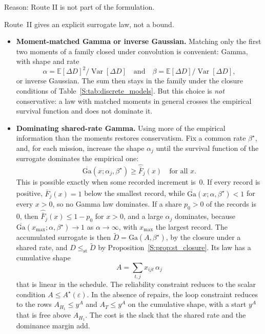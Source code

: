 \documentclass[11pt,a4paper]{article}
\theoremstyle{plain}
\theoremstyle{definition}
\theoremstyle{remark}
\begin{document}
Reason: Route II is not part of the formulation.

Route~II gives an explicit surrogate law, not a bound.
\begin{itemize}
  \item \textbf{Moment-matched Gamma or inverse Gaussian.} Matching only the first two moments of a family closed under convolution is convenient: Gamma, with shape and rate
    \begin{equation}
      \alpha = \mathbb{E}[\Delta D]^2/\operatorname{Var}[\Delta D]
      \quad\text{and}\quad
      \beta = \mathbb{E}[\Delta D]/\operatorname{Var}[\Delta D],
    \end{equation}
    or inverse Gaussian.
    The sum then stays in the family under the closure conditions of Table~\ref{S:tab:discrete_models}.
    But this choice is \emph{not} conservative: a law with matched moments in general crosses the empirical survival function and does not dominate it.
  \item \textbf{Dominating shared-rate Gamma.} Using more of the empirical information than the moments restores conservatism.
    Fix a common rate $\beta^\star$, and, for each mission, increase the shape $\alpha_j$ until the survival function of the surrogate dominates the empirical one:
    \begin{equation}
      \overline{\mathrm{Ga}}(x;\alpha_j,\beta^\star) \ge \widehat{\bar F}_j(x) \quad \text{for all } x.
    \end{equation}
    This is possible exactly when some recorded increment is~$0$.
    If every record is positive, $\widehat{\bar F}_j(x) = 1$ below the smallest record, while $\overline{\mathrm{Ga}}(x;\alpha,\beta^\star) < 1$ for every $x > 0$, so no Gamma law dominates.
    If a share $p_0 > 0$ of the records is~$0$, then $\widehat{\bar F}_j(x) \le 1 - p_0$ for $x > 0$, and a large $\alpha_j$ dominates, because $\overline{\mathrm{Ga}}(x_{\max};\alpha,\beta^\star) \to 1$ as $\alpha \to \infty$, with $x_{\max}$ the largest record.
    The accumulated surrogate is then $\widetilde{D} = \mathrm{Ga}(A,\beta^\star)$, by the closure under a shared rate, and $D \le_{\mathrm{st}} \widetilde{D}$ by Proposition~\ref{S:prop:st_closure}.
    Its law has a cumulative shape
    \begin{equation}
      A = \sum_{t,j} x_{ijt}\,\alpha_j
    \end{equation}
    that is linear in the schedule.
    The reliability constraint reduces to the scalar condition $A \le A^\star(\varepsilon)$.
    In the absence of repairs, the loop constraint reduces to the rows $A_{H_1} \le y^{A}$ and $A_T \le y^{A}$ on the cumulative shape, with a start $y^{A}$ that is free above $A_{H_1}$.
    The cost is the slack that the shared rate and the dominance margin add.
\end{itemize}
\end{document}
